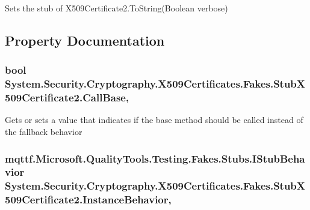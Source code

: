 Sets the stub of X509\-Certificate2.\-To\-String(\-Boolean verbose)



\subsection{Property Documentation}
\hypertarget{class_system_1_1_security_1_1_cryptography_1_1_x509_certificates_1_1_fakes_1_1_stub_x509_certificate2_a6111813a77e320dffa2b664c130a5c5d}{
\subsubsection[{Call\-Base}]{\setlength{\rightskip}{0pt plus 5cm}bool System.\-Security.\-Cryptography.\-X509\-Certificates.\-Fakes.\-Stub\-X509\-Certificate2.\-Call\-Base\hspace{0.3cm}{\ttfamily [get]}, {\ttfamily [set]}}}\label{class_system_1_1_security_1_1_cryptography_1_1_x509_certificates_1_1_fakes_1_1_stub_x509_certificate2_a6111813a77e320dffa2b664c130a5c5d}


Gets or sets a value that indicates if the base method should be called instead of the fallback behavior

\hypertarget{class_system_1_1_security_1_1_cryptography_1_1_x509_certificates_1_1_fakes_1_1_stub_x509_certificate2_a845f50abecbae25364a8596f2c314462}{
\subsubsection[{Instance\-Behavior}]{\setlength{\rightskip}{0pt plus 5cm}mqttf.\-Microsoft.\-Quality\-Tools.\-Testing.\-Fakes.\-Stubs.\-I\-Stub\-Behavior System.\-Security.\-Cryptography.\-X509\-Certificates.\-Fakes.\-Stub\-X509\-Certificate2.\-Instance\-Behavior\hspace{0.3cm}{\ttfamily [get]}, {\ttfamily [set]}}}\label{class_system_1_1_security_1_1_cryptography_1_1_x509_certificates_1_1_fakes_1_1_stub_x509_certificate2_a845f50abecbae25364a8596f2c314462}


